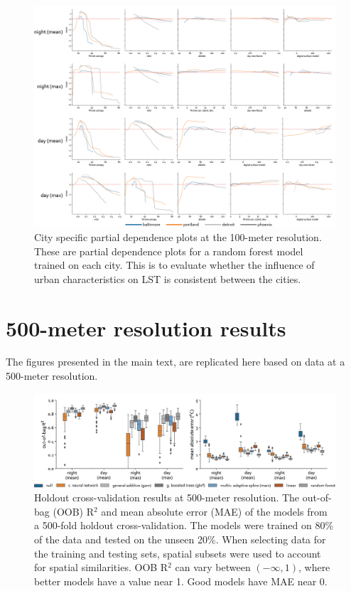 \documentclass[review]{elsarticle}
\begin{document}
\begin{figure}[h]
    \centering
    \includegraphics[width=\linewidth]{fig/report/pdp_cities_100.png}
    \caption[City specific partial dependence plots at the 100-meter resolution]{
    City specific partial dependence plots at the 100-meter resolution.
    These are partial dependence plots for a random forest model trained on each city.
    This is to evaluate whether the influence of urban characteristics on LST is consistent between the cities.
    }
    \label{fig:cities_100}
\end{figure}


\clearpage
\section{500-meter resolution results}
\label{ss:500_meter}
The figures presented in the main text, are replicated here based on data at a 500-meter resolution.

\begin{figure}[h]
    \centering
    \includegraphics[width=\linewidth]{fig/report/holdout_500.png}
    \caption[Holdout cross-validation results at 500-meter resolution]{
    Holdout cross-validation results at 500-meter resolution. 
    The out-of-bag (OOB) R$^2$ and mean absolute error (MAE) of the models from a 500-fold holdout cross-validation. 
    The models were trained on 80\% of the data and tested on the unseen 20\%.
    When selecting data for the training and testing sets, spatial subsets were used to account for spatial similarities. 
    OOB R$^2$ can vary between $(-\infty, 1)$, where better models have a value near 1. 
    Good models have MAE near 0.
    }
    \label{fig:holdout_500}
\end{figure}
\end{document}
